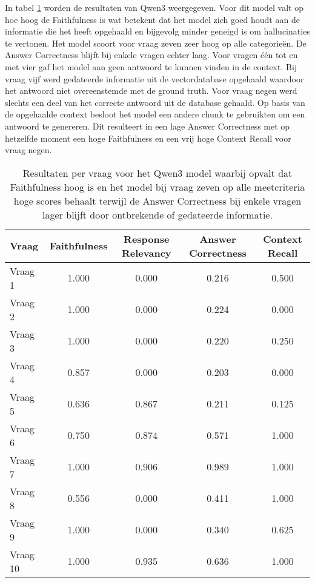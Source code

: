 In tabel \ref{tab:resultaten_vragen_qwen3} worden de resultaten van Qwen3 weergegeven. Voor dit model valt op hoe hoog de Faithfulness is wat betekent dat het model zich goed houdt aan de informatie die het heeft opgehaald en bijgevolg minder geneigd is om hallucinaties te vertonen. Het model scoort voor vraag zeven zeer hoog op alle categorieën. De Answer Correctness blijft bij enkele vragen echter laag. Voor vragen één tot en met vier gaf het model aan geen antwoord te kunnen vinden in de context. Bij vraag vijf werd gedateerde informatie uit de vectordatabase opgehaald waardoor het antwoord niet overeenstemde met de ground truth. Voor vraag negen werd slechts een deel van het correcte antwoord uit de database gehaald. Op basis van de opgehaalde context besloot het model een andere chunk te gebruikten om een antwoord te genereren. Dit resulteert in een lage Answer Correctness met op hetzelfde moment een hoge Faithfulness en een vrij hoge Context Recall voor vraag negen.

\begin{table}[H]
    \begin{tabular}{|l|c|c|c|c|}
        \hline
        \textbf{Vraag} & \textbf{Faithfulness} & \textbf{Response Relevancy} & \textbf{Answer Correctness} & \textbf{Context Recall} \\
        \hline
        Vraag 1  & 1.000 & 0.000 & 0.216 & 0.500 \\
        Vraag 2  & 1.000 & 0.000 & 0.224 & 0.000 \\
        Vraag 3  & 1.000 & 0.000 & 0.220 & 0.250 \\
        Vraag 4  & 0.857 & 0.000 & 0.203 & 0.000 \\
        Vraag 5  & 0.636 & 0.867 & 0.211 & 0.125 \\
        Vraag 6  & 0.750 & 0.874 & 0.571 & 1.000 \\
        Vraag 7  & 1.000 & 0.906 & 0.989 & 1.000 \\
        Vraag 8  & 0.556 & 0.000 & 0.411 & 1.000 \\
        Vraag 9  & 1.000 & 0.000 & 0.340 & 0.625 \\
        Vraag 10 & 1.000 & 0.935 & 0.636 & 1.000 \\
        \hline
    \end{tabular}
    \caption{Resultaten per vraag voor het Qwen3 model waarbij opvalt dat Faithfulness hoog is en het model bij vraag zeven op alle meetcriteria hoge scores behaalt terwijl de Answer Correctness bij enkele vragen lager blijft door ontbrekende of gedateerde informatie.}
    \label{tab:resultaten_vragen_qwen3}
\end{table}


